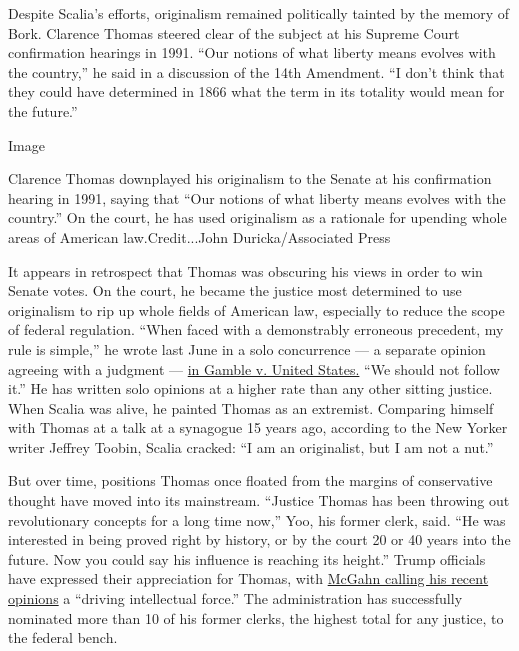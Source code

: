 Despite Scalia's efforts, originalism remained politically tainted by
the memory of Bork. Clarence Thomas steered clear of the subject at his
Supreme Court confirmation hearings in 1991. ``Our notions of what
liberty means evolves with the country,'' he said in a discussion of the
14th Amendment. ``I don't think that they could have determined in 1866
what the term in its totality would mean for the future.''

Image

Clarence Thomas downplayed his originalism to the Senate at his
confirmation hearing in 1991, saying that ``Our notions of what liberty
means evolves with the country.'' On the court, he has used originalism
as a rationale for upending whole areas of American law.Credit...John
Duricka/Associated Press

It appears in retrospect that Thomas was obscuring his views in order to
win Senate votes. On the court, he became the justice most determined to
use originalism to rip up whole fields of American law, especially to
reduce the scope of federal regulation. ``When faced with a demonstrably
erroneous precedent, my rule is simple,'' he wrote last June in a solo
concurrence --- a separate opinion agreeing with a judgment ---
\href{https://www.oyez.org/cases/2018/17-646}{in Gamble v. United
States.} ``We should not follow it.'' He has written solo opinions at a
higher rate than any other sitting justice. When Scalia was alive, he
painted Thomas as an extremist. Comparing himself with Thomas at a talk
at a synagogue 15 years ago, according to the New Yorker writer Jeffrey
Toobin, Scalia cracked: ``I am an originalist, but I am not a nut.''

But over time, positions Thomas once floated from the margins of
conservative thought have moved into its mainstream. ``Justice Thomas
has been throwing out revolutionary concepts for a long time now,'' Yoo,
his former clerk, said. ``He was interested in being proved right by
history, or by the court 20 or 40 years into the future. Now you could
say his influence is reaching its height.'' Trump officials have
expressed their appreciation for Thomas, with
\href{https://www.washingtonexaminer.com/opinion/reshaping-the-judiciary}{McGahn
calling his recent opinions} a ``driving intellectual force.'' The
administration has successfully nominated more than 10 of his former
clerks, the highest total for any justice, to the federal bench.

